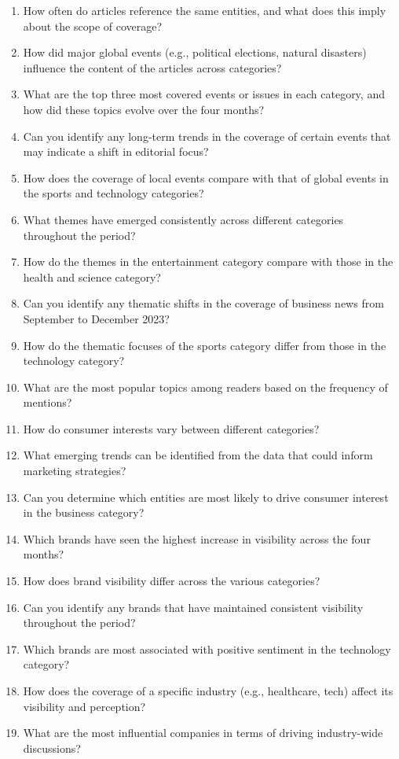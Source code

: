 \begin{footnotesize}
\begin{enumerate}[label={\(q_{\arabic*}\).},start=0]
\item How often do articles reference the same entities, and what does this imply about the scope of coverage?
\item How did major global events (e.g., political elections, natural disasters) influence the content of the articles across categories?
\item What are the top three most covered events or issues in each category, and how did these topics evolve over the four months?
\item Can you identify any long-term trends in the coverage of certain events that may indicate a shift in editorial focus?
\item How does the coverage of local events compare with that of global events in the sports and technology categories?
\item What themes have emerged consistently across different categories throughout the period?
\item How do the themes in the entertainment category compare with those in the health and science category?
\item Can you identify any thematic shifts in the coverage of business news from September to December 2023?
\item How do the thematic focuses of the sports category differ from those in the technology category?
\item What are the most popular topics among readers based on the frequency of mentions?
\item How do consumer interests vary between different categories?
\item What emerging trends can be identified from the data that could inform marketing strategies?
\item Can you determine which entities are most likely to drive consumer interest in the business category?
\item Which brands have seen the highest increase in visibility across the four months?
\item How does brand visibility differ across the various categories?
\item Can you identify any brands that have maintained consistent visibility throughout the period?
\item Which brands are most associated with positive sentiment in the technology category?
\item How does the coverage of a specific industry (e.g., healthcare, tech) affect its visibility and perception?
\item What are the most influential companies in terms of driving industry-wide discussions?

\end{enumerate}
\end{footnotesize}
